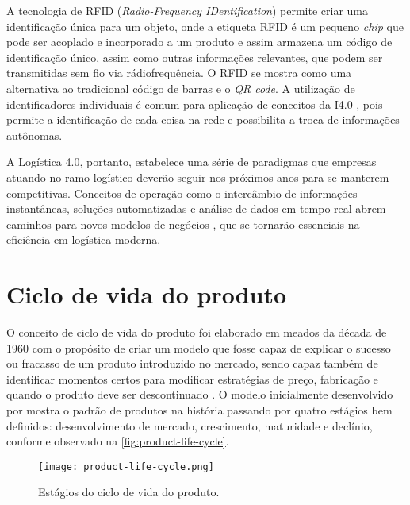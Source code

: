 A tecnologia de RFID (\textit{Radio-Frequency IDentification}) permite criar uma identificação única para um objeto, onde a etiqueta RFID é um pequeno \textit{chip} que pode ser acoplado e incorporado a um produto e assim armazena um código de identificação único, assim como outras informações relevantes, que podem ser transmitidas sem fio via rádiofrequência. O RFID se mostra como uma alternativa ao tradicional código de barras e o \textit{QR code}. A utilização de identificadores individuais é comum para aplicação de conceitos da I4.0 \cite{alyahya2016rfidwarehousing, vlachos2014rfidimpact, fan2015inventory, bibi2017rfidfood}, pois permite a identificação de cada coisa na rede e possibilita a troca de informações autônomas.

A Logística 4.0, portanto, estabelece uma série de paradigmas que empresas atuando no ramo logístico deverão seguir nos próximos anos para se manterem competitivas. Conceitos de operação como o intercâmbio de informações instantâneas, soluções automatizadas e análise de dados em tempo real abrem caminhos para novos modelos de negócios \cite{strandhagen2017logistics}, que se tornarão essenciais na eficiência em logística moderna.


\section{Ciclo de vida do produto}

O conceito de ciclo de vida do produto foi elaborado em meados da década de 1960 com o propósito de criar um modelo que fosse capaz de explicar o sucesso ou fracasso de um produto introduzido no mercado, sendo capaz também de identificar momentos certos para modificar estratégias de preço, fabricação e quando o produto deve ser descontinuado \cite{cao2012lifecycle}. O modelo inicialmente desenvolvido por  mostra o padrão de produtos na história passando por quatro estágios bem definidos: desenvolvimento de mercado, crescimento, maturidade e declínio, conforme observado na \autoref{fig:product-life-cycle}.

\begin{figure}[htb]
	\centering
	\texttt{[image: product-life-cycle.png]}
	\caption{Estágios do ciclo de vida do produto.}
	\label{fig:product-life-cycle}
\end{figure}

